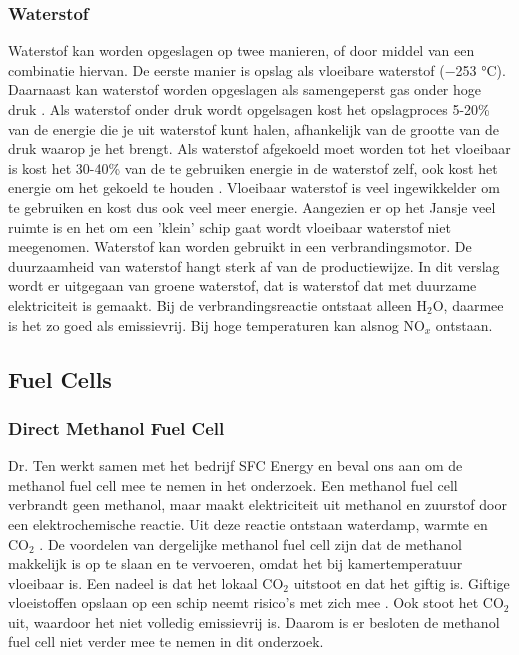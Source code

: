 \subsubsection{\textbf{Waterstof}}
Waterstof kan worden opgeslagen op twee manieren, of door middel van een combinatie hiervan. De eerste manier is opslag als vloeibare waterstof (−253 °C). Daarnaast kan waterstof worden opgeslagen als samengeperst gas onder hoge druk \cite{EngineeringToolboxHydrogen}. Als waterstof onder druk wordt opgelsagen kost het opslagproces 5-20\% van de energie die je uit waterstof kunt halen, afhankelijk van de grootte van de druk waarop je het brengt. Als waterstof afgekoeld moet worden tot het vloeibaar is kost het 30-40\% van de te gebruiken energie in de waterstof zelf, ook kost het energie om het gekoeld te houden \cite{doe2009hydrogencompression}. Vloeibaar waterstof is veel ingewikkelder om te gebruiken en kost dus ook veel meer energie. Aangezien er op het Jansje veel ruimte is en het om een 'klein' schip gaat wordt vloeibaar waterstof niet meegenomen. 
Waterstof kan worden gebruikt in een verbrandingsmotor. De duurzaamheid van waterstof hangt sterk af van de productiewijze. In dit verslag wordt er uitgegaan van groene waterstof, dat is waterstof dat met duurzame elektriciteit is gemaakt. Bij de verbrandingsreactie ontstaat alleen H$_2$O, daarmee is het zo goed als emissievrij. Bij hoge temperaturen kan alsnog NO$_x$ ontstaan. 



\subsection*{Fuel Cells}
\subsubsection{\textbf{Direct Methanol Fuel Cell}}
Dr. Ten werkt samen met het bedrijf SFC Energy en beval ons aan om de methanol fuel cell mee te nemen in het onderzoek. Een methanol fuel cell verbrandt geen methanol, maar maakt elektriciteit uit methanol en zuurstof door een elektrochemische reactie. Uit deze reactie ontstaan waterdamp, warmte en CO$_2$ \cite{SFCMethanolFuelCell}. De voordelen van dergelijke methanol fuel cell zijn dat de methanol makkelijk is op te slaan en te vervoeren, omdat het bij kamertemperatuur vloeibaar is. Een nadeel is dat het lokaal CO$_2$ uitstoot en dat het giftig is. Giftige vloeistoffen opslaan op een schip neemt risico's met zich mee \label{methanolgiftig}. Ook stoot het CO$_2$ uit, waardoor het niet volledig emissievrij is. Daarom is er besloten de methanol fuel cell niet verder mee te nemen in dit onderzoek.

